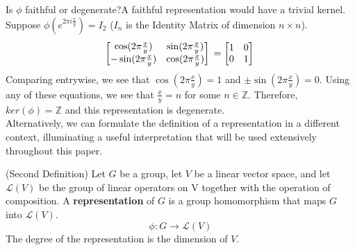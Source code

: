 	\noindent Is $\phi$ faithful or degenerate?A faithful representation would have a trivial kernel. Suppose $\phi(e^{2\pi i\frac{x}{y}}) = I_2$ ($I_n$ is the Identity Matrix of dimension $n\times n$). 
	\begin{equation}
			\begin{bmatrix}
				\cos(2\pi\frac{x}{y}) & \sin(2\pi\frac{x}{y}) \\
				-\sin(2\pi\frac{x}{y}) & \cos(2\pi\frac{x}{y})
			\end{bmatrix}\\
			= \begin{bmatrix}
				1 & 0 \\
				0 & 1 \\
			\end{bmatrix}\\
	\end{equation}
	\noindent Comparing entrywise, we see that $\cos(2\pi\frac{x}{y}) = 1$ and $\pm\sin(2\pi\frac{x}{y}) = 0$. Using any of these equations, we see that $\frac{x}{y}= n$ for some $n\in\mathbb{Z}$. Therefore, $ker(\phi)=\mathbb{Z}$ and this representation is degenerate.\\


Alternatively, we can formulate the definition of a representation in a different context, illuminating a useful interpretation that will be used extensively throughout this paper.

\begin{definition}
	(Second Definition) Let $G$ be a group, let $V$ be a linear vector space, and let $\mathcal{L}(V)$ be the group of linear operators on V together with the operation of composition. A \textbf{representation} of $G$ is a group homomorphism that maps $G$ into $\mathcal{L}(V)$.
	$$\phi : G \rightarrow \mathcal{L}(V)$$
The degree of the representation is the dimension of $V$.
\end{definition}

